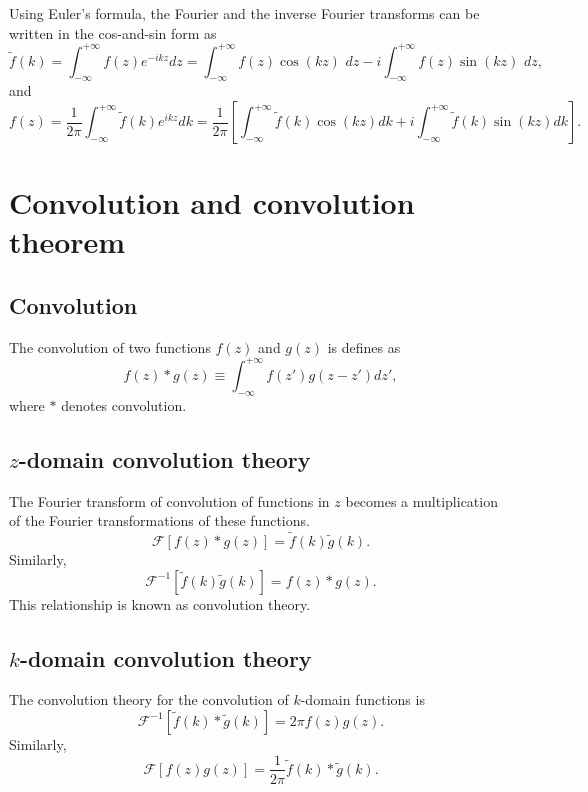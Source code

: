 \documentclass[a4paper]{article}
\newcommand{\ftf}[1]{{\mathcal{F}\left[#1\right]\xspace}}
\newcommand{\iftf}[1]{{\mathcal{F}^{-1}\left[#1\right]\xspace}}
\newcommand{\ftt}[1]{{\tilde{#1}\xspace}}
\begin{document}
Using Euler's formula, the Fourier and the inverse Fourier transforms can be written in the cos-and-sin form as
\begin{equation}
	\ftt{f}(k) = \int^{+\infty}_{-\infty} f(z) e^{-ikz}dz =
	 \int^{+\infty}_{-\infty} f(z) \cos(kz) \,\, dz
	-i\int^{+\infty}_{-\infty} f(z) \sin(kz) \,\, dz,
\end{equation}
and
\begin{equation}
	f(z) = \frac{1}{2\pi} \int^{+\infty}_{-\infty} \ftt{f}(k) e^{ikz} dk =
	\frac{1}{2\pi} \left[\int^{+\infty}_{-\infty} \ftt{f}(k) \cos(kz) dk
	+i \int^{+\infty}_{-\infty} \ftt{f}(k) \sin(kz) dk\right].
\end{equation}

\section{Convolution and convolution theorem}
\subsection{Convolution}
The convolution of two functions $f(z)$ and $g(z)$ is defines as
\begin{equation}
	f(z)*g(z) \equiv \int_{-\infty}^{+\infty} f\left(z'\right)g\left(z-z'\right	)dz',
\end{equation}
where $*$ denotes convolution.
\subsection{$z$-domain convolution theory}
The Fourier transform of convolution of functions in $z$ becomes a multiplication of the Fourier transformations of these functions.
\begin{equation}
	\ftf{f(z)*g(z)} = \ftt{f}(k) \ftt{g}(k).
\end{equation}
Similarly,
\begin{equation}
	\iftf{\ftt{f}(k)\ftt{g}(k)} = f(z)*g(z).
\end{equation}
This relationship is known as convolution theory.

\subsection{$k$-domain convolution theory}
The convolution theory for the convolution of $k$-domain functions is
\begin{equation}
	\iftf{\ftt{f}(k)*\ftt{g}(k)} = 2\pi f(z) g(z).
\end{equation}
Similarly,
\begin{equation}
	\ftf{{f}(z)g(z)} = \frac{1}{2\pi}\ftt{f}(k)*\ftt{g}(k).
\end{equation}
\end{document}
